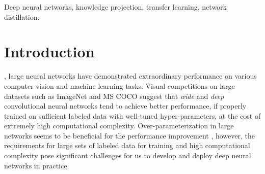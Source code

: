 \documentclass[journal]{IEEEtran}
\begin{document}
\begin{IEEEkeywords}
Deep neural networks, knowledge projection, transfer learning, network distillation.
\end{IEEEkeywords}



\renewcommand{\baselinestretch}{2.1}


%
\IEEEpeerreviewmaketitle



\section{Introduction}
% 
% 
% 
% 


, large neural networks have demonstrated extraordinary performance on various computer vision and machine learning tasks. Visual competitions on large datasets such as ImageNet \cite{ILSVRC15} and MS COCO \cite{MSCOCO} suggest that \textit{wide} and \textit{deep} convolutional neural networks tend to achieve better performance, if properly trained on sufficient labeled data with well-tuned hyper-parameters, at the cost of extremely high computational complexity. Over-parameterization in large networks seems to be beneficial for the performance improvement \cite{denil2013predicting, hinton2012improving}, however,
the requirements for large sets of labeled data for training and high computational complexity pose significant challenges for us to develop and deploy deep neural networks in practice. 
\end{document}
